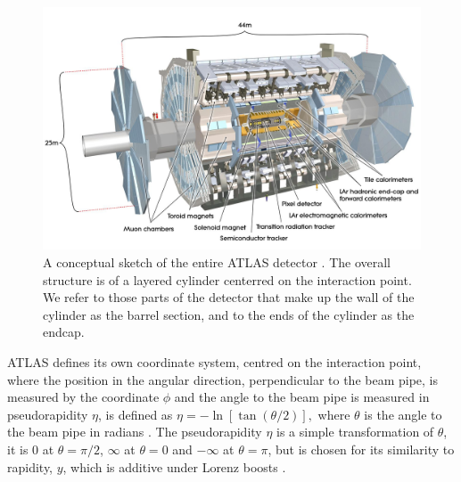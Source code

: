 \begin{english}
\begin{figure}[hbtp]
\begin{minipage}[b]{.69\textwidth}
\includegraphics[width=2\textwidth]{AllAtlas2}
\end{minipage}
\begin{minipage}[b]{.3\textwidth}
\caption{A conceptual sketch of the entire ATLAS detector \cite{atlasweb}. The overall structure is of a layered cylinder centerred on the interaction point. We refer to those parts of the detector that make up the wall of the cylinder as the barrel section, and to the ends of the cylinder as the endcap.}
\end{minipage}
\label{allatlas}
\end{figure}

ATLAS defines its own coordinate system, centred on the interaction point, where the position in the angular direction, perpendicular to the beam pipe, is measured by the coordinate $\phi$ and the angle to the beam pipe is measured in pseudorapidity $\eta$, is defined as
\(\eta=-\ln[\tan(\theta/2)],\)
where $\theta$ is the angle to the beam pipe in radians \cite{green:eta}. The pseudorapidity $\eta$ is a simple transformation of $\theta$, it is 0 at $\theta=\pi/2$, $\infty$ at $\theta=0$ and $-\infty$ at $\theta=\pi$, but is chosen for its similarity to rapidity, $y$, which is additive under Lorenz boosts \cite{green:y}.


\end{english}
